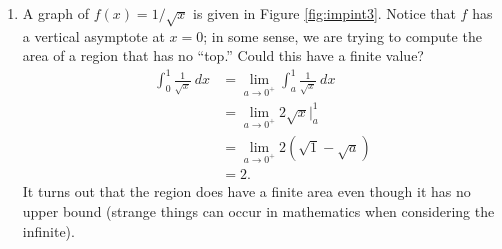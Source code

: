 {\begin{enumerate}
\item		A graph of $f(x) = 1/\sqrt{x}$ is given in Figure \ref{fig:impint3}. Notice that $f$ has a vertical asymptote at $x=0$; in some sense, we are trying to compute the area of a region that has no ``top.'' Could this have a finite value? 
\begin{align*} \int_0^1 \frac{1}{\sqrt{x}}\ dx &= \lim_{a\to0^+}\int_a^1 \frac1{\sqrt{x}}\ dx \\
			&=	\lim_{a\to0^+} 2\sqrt{x}\Big|_a^1 \\
			&= \lim_{a\to0^+} 2\left(\sqrt{1}-\sqrt{a}\right)\\
			&=	2.
\end{align*}
It turns out that the region does have a finite area even though it has no upper bound (strange things can occur in mathematics when considering the infinite).



\end{enumerate}}

